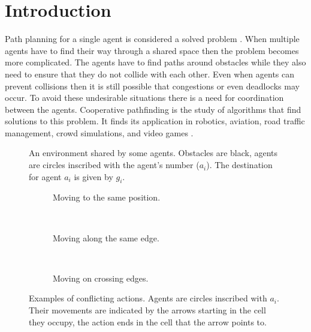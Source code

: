 \section{Introduction}\label{sec:intro}
Path planning for a single agent is considered a solved problem
\cite{sharon2013}. When multiple agents have to find their way through a
shared
space then the problem becomes more complicated. The agents have to find paths
around obstacles while they also need to ensure that they do not collide with
each other. Even when agents can prevent collisions then it is still possible
that congestions or even deadlocks may occur. To avoid these undesirable
situations there is a need for coordination between the agents. Cooperative 
pathfinding is the study of algorithms that find solutions to this problem.
It finds its application in robotics, aviation, road traffic management, crowd 
simulations, and video games \cite{standley2011}.

\begin{figure}[t]
    \centering
    \def\svgscale{.5}
    
    \caption{An environment shared by some agents. Obstacles are black, agents
        are circles inscribed with the agent's number ($a_i$). The destination
        for agent $a_i$ is given by $g_i$.}
    \label{fig:world}
\end{figure}

\begin{figure}[t]
    \centering
    \begin{subfigure}[b]{.18\textwidth}
        \centering
        \def\svgscale{.5}
        
        \caption{Moving to the same position.}
        \label{fig:conflict-position}
    \end{subfigure}
    ~
    \begin{subfigure}[b]{.13\textwidth}
        \centering
        \def\svgscale{.5}
        
        \caption{Moving along the same edge.}
        \label{fig:conflict-same}
    \end{subfigure}
    ~
    \begin{subfigure}[b]{.13\textwidth}
        \centering
        \def\svgscale{.5}
        
        \caption{Moving on crossing edges.}
        \label{fig:conflict-crossing}
    \end{subfigure}
    \caption{Examples of conflicting actions. Agents are circles inscribed with
        $a_i$. Their movements are indicated by the arrows starting in the cell
        they occupy, the action ends in the cell that the arrow points to.}
    \label{fig:conflicts}
\end{figure}

